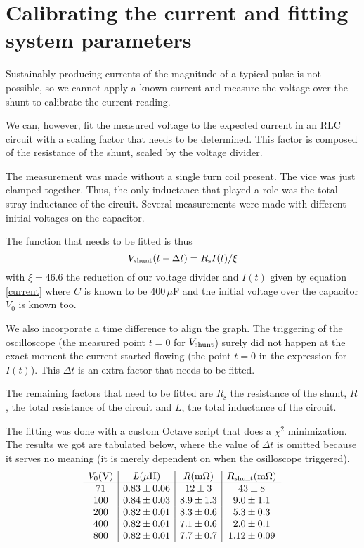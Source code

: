 
\section{Calibrating the current and fitting system parameters 
\label{secIcalib}}
Sustainably producing currents of the magnitude of a typical pulse is not 
possible, so we cannot apply a known current and measure the voltage over 
the shunt to calibrate the current reading.

We can, however, fit the measured voltage to the expected current in an RLC 
circuit with a scaling factor that needs to be determined. This factor is 
composed of the resistance of the shunt, scaled by the voltage divider. 

The measurement was made without a single turn coil present. The vice was 
just clamped together. Thus, the only inductance that played a role was the 
total stray inductance of the circuit. Several measurements were made with 
different initial voltages on the capacitor.

The function that needs to be fitted is thus
$$
V_\mathrm{shunt}(t - \Delta t) = R_\mathrm s I(t) / \xi
$$
with $\xi = 46.6$ the reduction of our voltage divider and $I(t)$ given by 
equation \ref{current} where $C$ is known to be 400\,$\mu$F and the initial 
voltage over the capacitor $V_0$ is known too.

We also incorporate a time difference to align the graph. The triggering of 
the oscilloscope (the measured point $t = 0$ for $V_\mathrm{shunt}$) surely did not 
happen at the exact moment the current started flowing (the point $t = 0$ 
in the expression for $I(t)$). This $\Delta t$ is an extra factor that 
needs to be fitted.

The remaining factors that need to be fitted are $R_\mathrm s$ the 
resistance of the shunt, $R$, the total resistance of the circuit and $L$, 
the total inductance of the circuit.

The fitting was done with a custom Octave script that does a $\chi^2$ 
minimization. The results we got are tabulated below, where the value of 
$\Delta t$ is omitted because it serves no meaning (it is merely dependent 
on when the osilloscope triggered).
$$
\begin{array}{c|c|c|c}
V_0 (\mathrm V)&
	L (\mu\mathrm H)&
			R (\mathrm m \Omega)&
				R_\mathrm{shunt} (\mathrm m \Omega)\\\hline
71&	0.83 \pm 0.06&	12 \pm 3&	43 \pm 8\\
100&	0.84 \pm 0.03&	8.9 \pm 1.3&	9.0 \pm 1.1\\
200&	0.82 \pm 0.01&	8.3 \pm 0.6&	5.3 \pm 0.3\\
400&	0.82 \pm 0.01&	7.1 \pm 0.6&	2.0 \pm 0.1\\
800&	0.82 \pm 0.01&	7.7 \pm 0.7&	1.12 \pm 0.09\\
\end{array}
$$

